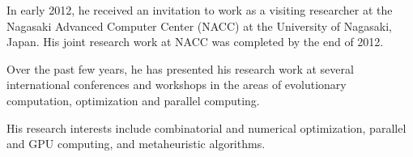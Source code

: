 In early 2012, he received an invitation to work as a visiting researcher
at the Nagasaki Advanced Computer Center (NACC) at the University
of Nagasaki, Japan. His joint research work at NACC was completed
by the end of 2012.

Over the past few years, he has presented his research work at several
international conferences and workshops in the areas of evolutionary
computation, optimization and parallel computing.

His research interests include combinatorial and numerical optimization,
parallel and GPU computing, and metaheuristic algorithms.
